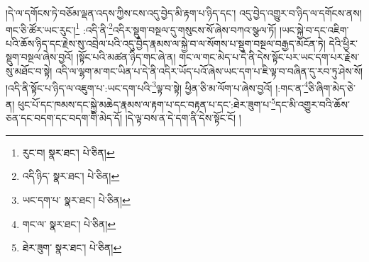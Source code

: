 །དེ་ལ་དགོངས་ཏེ་བཅོམ་ལྡན་འདས་ཀྱིས་ངས་འདུ་བྱེད་མི་རྟག་པ་ཉིད་དང་། འདུ་བྱེད་འགྱུར་བ་ཉིད་ལ་དགོངས་ནས། གང་ཅི་ཚོར་ཡང་རུང་།\footnote{རུང་བ།  སྣར་ཐང་།  པེ་ཅིན། } :འདི་ནི་\footnote{འདི་ཉིད་  སྣར་ཐང་།  པེ་ཅིན། }འདིར་སྡུག་བསྔལ་དུ་གསུངས་སོ་ཞེས་བཀའ་སྩལ་ཏོ། །ཡང་སྐྱེ་བ་དང་འཇིག་པའི་ཆོས་ཉིད་དང་རྗེས་སུ་འབྲེལ་པའི་འདུ་བྱེད་རྣམས་ལ་སྐྱེ་བ་ལ་སོགས་པ་སྡུག་བསྔལ་བརྒྱད་མངོན་ཏེ། དེའི་ཕྱིར་སྡུག་བསྔལ་ཞེས་བྱའོ། །སྟོང་པའི་མཚན་ཉིད་གང་ཞེ་ན། གང་ལ་གང་མེད་པ་དེ་ནི་དེས་སྟོང་པར་ཡང་དག་པར་རྗེས་སུ་མཐོང་བ་སྟེ། འདི་ལ་ལྷག་མ་གང་ཡིན་པ་དེ་ནི་འདིར་ཡོད་པའོ་ཞེས་ཡང་དག་པ་ཇི་ལྟ་བ་བཞིན་དུ་རབ་ཏུ་ཤེས་སོ། །འདི་ནི་སྟོང་པ་ཉིད་ལ་འཇུག་པ་:ཡང་དག་པའི་\footnote{ཡང་དག་པ་  སྣར་ཐང་།  པེ་ཅིན། }ལྟ་བ་སྟེ། ཕྱིན་ཅི་མ་ལོག་པ་ཞེས་བྱའོ། །:གང་ན་\footnote{གང་ལ་  སྣར་ཐང་།  པེ་ཅིན། }ཅི་ཞིག་མེད་ཅེ་ན། ཕུང་པོ་དང་ཁམས་དང་སྐྱེ་མཆེད་རྣམས་ལ་རྟག་པ་དང་བརྟན་པ་དང་:ཐེར་ཟུག་པ་\footnote{ཐེར་ཟུག་  སྣར་ཐང་།  པེ་ཅིན། }དང་མི་འགྱུར་བའི་ཆོས་ཅན་དང་བདག་དང་བདག་གི་མེད་དོ། །དེ་ལྟ་བས་ན་དེ་དག་ནི་དེས་སྟོང་ངོ། །

